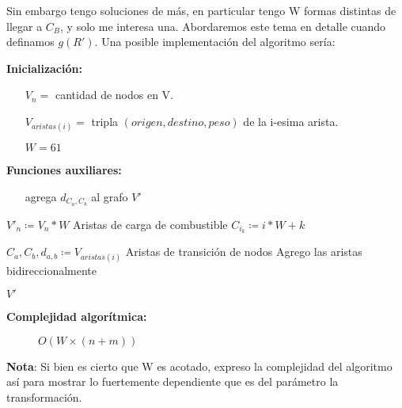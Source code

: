 \documentclass[12pt]{article}
\def\is{\coloneqq}
\begin{document}
Sin embargo tengo soluciones de más, en particular tengo W formas distintas de llegar a $C_B$, y solo me interesa una. Abordaremos este tema en detalle cuando definamos $g(R')$. Una posible implementación del algoritmo sería:

\begin{algorithm}[H]
	\caption{$f(V)$}
	\begin{algorithmic}[1]
		\item[\textbf{Inicialización:}]
		\item[] \begin{itemize}
			\item[] $V_n = $ cantidad de nodos en V.
			\item[] $V_{aristas(i)} = $ tripla $(origen, destino, peso)$ de la i-esima arista.
			\item[] $W = 61$
		\end{itemize}
		\item[\textbf{Funciones auxiliares:}]
		\item[] \begin{itemize}
			\item[]  agrega $d_{C_a,C_b}$ al grafo $V'$
		\end{itemize}
		\Statex
		\State $V'_n \is V_n * W$
		\Comment Aristas de carga de combustible
		\State $C_{i_k} \is i * W + k$
		\State {}
		\EndFor
		\EndFor
		\State
		
		\State $C_a,C_b,d_{a,b} \is V_{aristas(i)}$
		\Comment Aristas de transición de nodos
		\Comment Agrego las aristas bidireccionalmente
		\State {}
		\State {}
		\EndIf
		\EndFor
		\EndFor
		
		\State \Return $V'$
		\EndFunction
	\end{algorithmic}
	\begin{description}
		\item[\textbf{Complejidad algorítmica:}] $O(W \times (n + m))$
	\end{description}
\end{algorithm}

\textbf{Nota}: Si bien es cierto que W es acotado, expreso la complejidad del algoritmo así para mostrar lo fuertemente dependiente que es del parámetro la transformación. 
\end{document}
